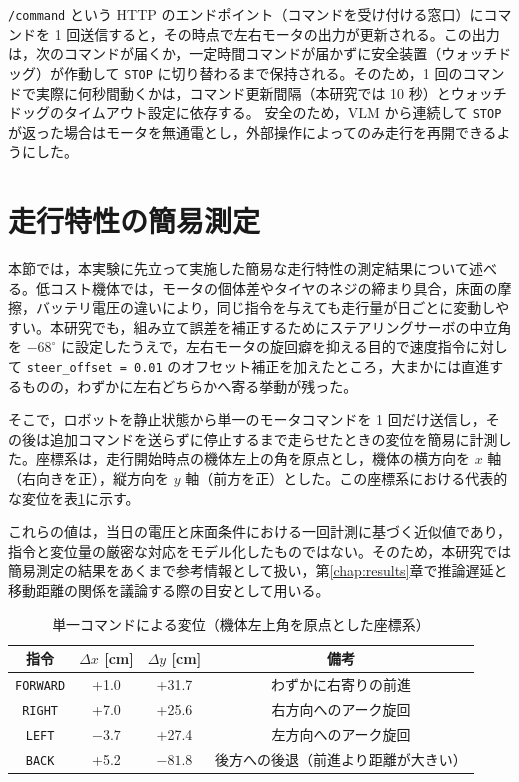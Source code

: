 \documentclass[a4paper,11pt]{ltjsreport}
\begin{document}
\texttt{/command} という HTTP のエンドポイント（コマンドを受け付ける窓口）にコマンドを 1 回送信すると，その時点で左右モータの出力が更新される。この出力は，次のコマンドが届くか，一定時間コマンドが届かずに安全装置（ウォッチドッグ）が作動して \texttt{STOP} に切り替わるまで保持される。そのため，1 回のコマンドで実際に何秒間動くかは，コマンド更新間隔（本研究では 10 秒）とウォッチドッグのタイムアウト設定に依存する。
安全のため，VLM から連続して \texttt{STOP} が返った場合はモータを無通電とし，外部操作によってのみ走行を再開できるようにした。

\section{走行特性の簡易測定}
本節では，本実験に先立って実施した簡易な走行特性の測定結果について述べる。低コスト機体では，モータの個体差やタイヤのネジの締まり具合，床面の摩擦，バッテリ電圧の違いにより，同じ指令を与えても走行量が日ごとに変動しやすい。本研究でも，組み立て誤差を補正するためにステアリングサーボの中立角を \(-68^\circ\) に設定したうえで，左右モータの旋回癖を抑える目的で速度指令に対して \texttt{steer\_offset = 0.01} のオフセット補正を加えたところ，大まかには直進するものの，わずかに左右どちらかへ寄る挙動が残った。

そこで，ロボットを静止状態から単一のモータコマンドを 1 回だけ送信し，その後は追加コマンドを送らずに停止するまで走らせたときの変位を簡易に計測した。座標系は，走行開始時点の機体左上の角を原点とし，機体の横方向を $x$ 軸（右向きを正），縦方向を $y$ 軸（前方を正）とした。この座標系における代表的な変位を表\ref{tab:single_cmd}に示す。

これらの値は，当日の電圧と床面条件における一回計測に基づく近似値であり，指令と変位量の厳密な対応をモデル化したものではない。そのため，本研究では簡易測定の結果をあくまで参考情報として扱い，第\ref{chap:results}章で推論遅延と移動距離の関係を議論する際の目安として用いる。

\begin{table}[htbp]
  \centering
  \caption{単一コマンドによる変位（機体左上角を原点とした座標系）}
  \label{tab:single_cmd}
  \begin{tabular}{|c|c|c|c|}
    \hline
    指令 & $\Delta x$ [cm] & $\Delta y$ [cm] & 備考 \\
    \hline
    \texttt{FORWARD} & +1.0 & +31.7 & わずかに右寄りの前進 \\
    \texttt{RIGHT}   & +7.0 & +25.6 & 右方向へのアーク旋回 \\
    \texttt{LEFT}    & $-3.7$ & +27.4 & 左方向へのアーク旋回 \\
    \texttt{BACK}    & +5.2 & $-81.8$ & 後方への後退（前進より距離が大きい） \\
    \hline
  \end{tabular}
\end{table}
\end{document}
